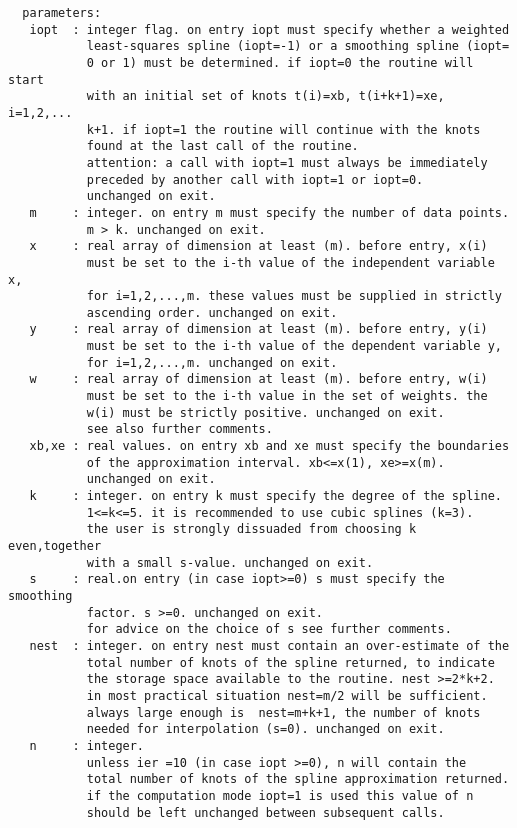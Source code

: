\begin{verbatim}
  parameters:
   iopt  : integer flag. on entry iopt must specify whether a weighted
           least-squares spline (iopt=-1) or a smoothing spline (iopt=
           0 or 1) must be determined. if iopt=0 the routine will start
           with an initial set of knots t(i)=xb, t(i+k+1)=xe, i=1,2,...
           k+1. if iopt=1 the routine will continue with the knots
           found at the last call of the routine.
           attention: a call with iopt=1 must always be immediately
           preceded by another call with iopt=1 or iopt=0.
           unchanged on exit.
   m     : integer. on entry m must specify the number of data points.
           m > k. unchanged on exit.
   x     : real array of dimension at least (m). before entry, x(i)
           must be set to the i-th value of the independent variable x,
           for i=1,2,...,m. these values must be supplied in strictly
           ascending order. unchanged on exit.
   y     : real array of dimension at least (m). before entry, y(i)
           must be set to the i-th value of the dependent variable y,
           for i=1,2,...,m. unchanged on exit.
   w     : real array of dimension at least (m). before entry, w(i)
           must be set to the i-th value in the set of weights. the
           w(i) must be strictly positive. unchanged on exit.
           see also further comments.
   xb,xe : real values. on entry xb and xe must specify the boundaries
           of the approximation interval. xb<=x(1), xe>=x(m).
           unchanged on exit.
   k     : integer. on entry k must specify the degree of the spline.
           1<=k<=5. it is recommended to use cubic splines (k=3).
           the user is strongly dissuaded from choosing k even,together
           with a small s-value. unchanged on exit.
   s     : real.on entry (in case iopt>=0) s must specify the smoothing
           factor. s >=0. unchanged on exit.
           for advice on the choice of s see further comments.
   nest  : integer. on entry nest must contain an over-estimate of the
           total number of knots of the spline returned, to indicate
           the storage space available to the routine. nest >=2*k+2.
           in most practical situation nest=m/2 will be sufficient.
           always large enough is  nest=m+k+1, the number of knots
           needed for interpolation (s=0). unchanged on exit.
   n     : integer.
           unless ier =10 (in case iopt >=0), n will contain the
           total number of knots of the spline approximation returned.
           if the computation mode iopt=1 is used this value of n
           should be left unchanged between subsequent calls.

\end{verbatim}
